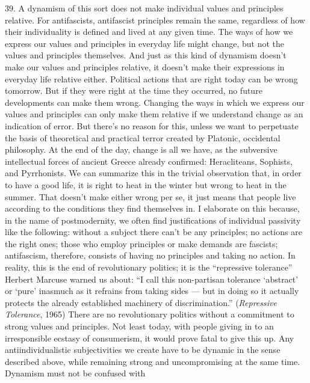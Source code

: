 {    39. A dynamism of this sort does not make individual values and principles
    relative. For antifascists, antifascist principles remain the same,
    regardless of how their individuality is defined and lived at any given
    time. The ways of how we express our values and principles in everyday life
    might change, but not the values and principles themselves. And just as this
    kind of dynamism doesn’t make our values and principles relative, it doesn’t
    make their expressions in everyday life relative either. Political actions
    that are right today can be wrong tomorrow. But if they were right at the
    time they occurred, no future developments can make them wrong. Changing the
    ways in which we express our values and principles can only make them
    relative if we understand change as an indication of error. But there’s no
    reason for this, unless we want to perpetuate the basis of theoretical and
    practical terror created by Platonic, occidental philosophy. At the end of
    the day, change is all we have, as the subversive intellectual forces of
    ancient Greece already confirmed: Heracliteans, Sophists, and Pyrrhonists.
    We can summarize this in the trivial observation that, in order to have a
    good life, it is right to heat in the winter but wrong to heat in the
    summer. That doesn’t make either wrong per se, it just means that people
    live according to the conditions they find themselves in. I elaborate on
    this because, in the name of postmodernity, we often find justifications of
    individual passivity like the following: without a subject there can’t be
    any principles; no actions are the right ones; those who employ principles
    or make demands are fascists; antifascism, therefore, consists of having no
    principles and taking no action. In reality, this is the end of
    revolutionary politics; it is the “repressive tolerance” Herbert Marcuse
    warned us about: “I call this non-partisan tolerance ‘abstract’ or ‘pure’
    inasmuch as it refrains from taking sides — but in doing so it actually
    protects the already established machinery of discrimination.”
    (\textit{Repressive Tolerance}, 1965) There are no revolutionary politics
    without a commitment to strong values and principles. Not least today, with
    people giving in to an irresponsible ecstasy of consumerism, it would prove
    fatal to give this up. Any antiindividualistic subjectivities we create have
    to be dynamic in the sense described above, while remaining strong and
    uncompromising at the same time. Dynamism must not be confused with
}
